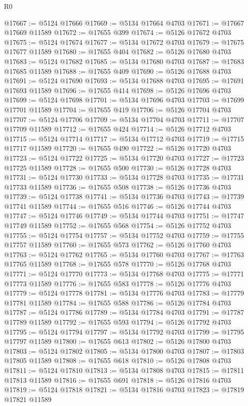 \begin{lexlean}{R0}
\begin{coremodule}
@17667 := @5124 @17666
@17669 := @5134 @17664 @4703
@17671 := @17667 @17669 @11589
@17672 := @17655 @399
@17674 := @5126 @17672 @4703
@17675 := @5124 @17674
@17677 := @5134 @17672 @4703
@17679 := @17675 @17677 @11589
@17680 := @17655 @404
@17682 := @5126 @17680 @4703
@17683 := @5124 @17682
@17685 := @5134 @17680 @4703
@17687 := @17683 @17685 @11589
@17688 := @17655 @409
@17690 := @5126 @17688 @4703
@17691 := @5124 @17690
@17693 := @5134 @17688 @4703
@17695 := @17691 @17693 @11589
@17696 := @17655 @414
@17698 := @5126 @17696 @4703
@17699 := @5124 @17698
@17701 := @5134 @17696 @4703
@17703 := @17699 @17701 @11589
@17704 := @17655 @419
@17706 := @5126 @17704 @4703
@17707 := @5124 @17706
@17709 := @5134 @17704 @4703
@17711 := @17707 @17709 @11589
@17712 := @17655 @424
@17714 := @5126 @17712 @4703
@17715 := @5124 @17714
@17717 := @5134 @17712 @4703
@17719 := @17715 @17717 @11589
@17720 := @17655 @490
@17722 := @5126 @17720 @4703
@17723 := @5124 @17722
@17725 := @5134 @17720 @4703
@17727 := @17723 @17725 @11589
@17728 := @17655 @500
@17730 := @5126 @17728 @4703
@17731 := @5124 @17730
@17733 := @5134 @17728 @4703
@17735 := @17731 @17733 @11589
@17736 := @17655 @508
@17738 := @5126 @17736 @4703
@17739 := @5124 @17738
@17741 := @5134 @17736 @4703
@17743 := @17739 @17741 @11589
@17744 := @17655 @516
@17746 := @5126 @17744 @4703
@17747 := @5124 @17746
@17749 := @5134 @17744 @4703
@17751 := @17747 @17749 @11589
@17752 := @17655 @568
@17754 := @5126 @17752 @4703
@17755 := @5124 @17754
@17757 := @5134 @17752 @4703
@17759 := @17755 @17757 @11589
@17760 := @17655 @573
@17762 := @5126 @17760 @4703
@17763 := @5124 @17762
@17765 := @5134 @17760 @4703
@17767 := @17763 @17765 @11589
@17768 := @17655 @578
@17770 := @5126 @17768 @4703
@17771 := @5124 @17770
@17773 := @5134 @17768 @4703
@17775 := @17771 @17773 @11589
@17776 := @17655 @583
@17778 := @5126 @17776 @4703
@17779 := @5124 @17778
@17781 := @5134 @17776 @4703
@17783 := @17779 @17781 @11589
@17784 := @17655 @588
@17786 := @5126 @17784 @4703
@17787 := @5124 @17786
@17789 := @5134 @17784 @4703
@17791 := @17787 @17789 @11589
@17792 := @17655 @593
@17794 := @5126 @17792 @4703
@17795 := @5124 @17794
@17797 := @5134 @17792 @4703
@17799 := @17795 @17797 @11589
@17800 := @17655 @613
@17802 := @5126 @17800 @4703
@17803 := @5124 @17802
@17805 := @5134 @17800 @4703
@17807 := @17803 @17805 @11589
@17808 := @17655 @618
@17810 := @5126 @17808 @4703
@17811 := @5124 @17810
@17813 := @5134 @17808 @4703
@17815 := @17811 @17813 @11589
@17816 := @17655 @691
@17818 := @5126 @17816 @4703
@17819 := @5124 @17818
@17821 := @5134 @17816 @4703
@17823 := @17819 @17821 @11589

\end{coremodule}
\end{lexlean}
